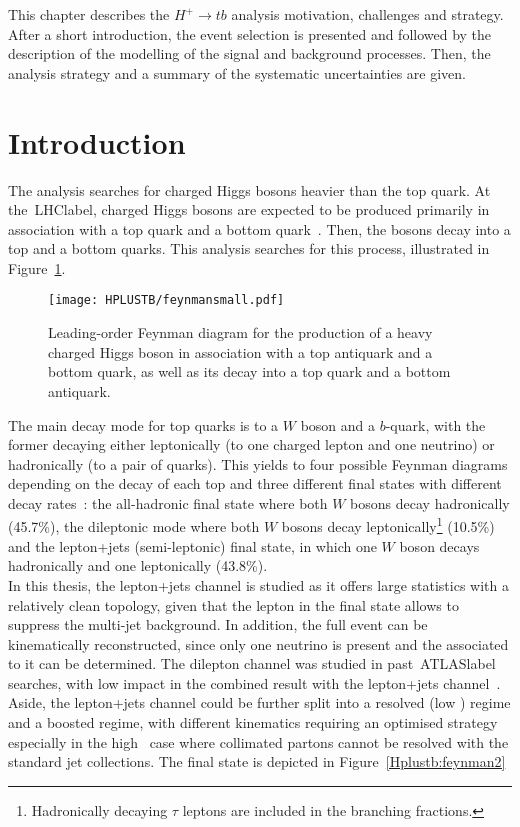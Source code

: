 This chapter describes the $H^+\to tb$ analysis motivation, challenges and strategy. After a short introduction, the event selection is presented and followed by the description of the modelling of the signal and background processes. Then, the analysis strategy and a summary of the systematic uncertainties are given.

\section{Introduction}
The analysis searches for charged Higgs bosons heavier than the top quark. At the~\acrshort{LHClabel}, charged Higgs bosons are expected to be produced primarily in association with a top quark and a bottom quark~\cite{CYRM-2017-002}. Then, the bosons decay into a top and a bottom quarks. This analysis searches for this process, illustrated in Figure~\ref{Hplustb:feynman1}.\\

\begin{figure}[htbp]
    \RawFloats
    \begin{center}
    \texttt{[image: HPLUSTB/feynmansmall.pdf]}
    \caption{
        Leading-order Feynman diagram for the production of a heavy charged Higgs boson in association with a top antiquark and a bottom quark, as well as its decay into a top quark and a bottom antiquark.
    }
    \label{Hplustb:feynman1}
    \end{center}
\end{figure}

The main decay mode for top quarks is to a $W$ boson and a $b$-quark, with the former decaying either leptonically (to one charged lepton and one neutrino) or hadronically (to a pair of quarks). This yields to four possible Feynman diagrams depending on the decay of each top and three different final states with different decay rates~\cite{pdg}: the all-hadronic final state where both $W$ bosons decay hadronically (45.7\%), the dileptonic mode where both $W$ bosons decay leptonically\footnote{Hadronically decaying $\tau$ leptons are included in the branching fractions.} (10.5\%) and the lepton+jets (semi-leptonic) final state, in which one $W$ boson decays hadronically and one leptonically (43.8\%).\\

In this thesis, the lepton+jets channel is studied as it offers large statistics with a relatively clean topology, given that the lepton in the final state allows to suppress the multi-jet background. In addition, the full event can be kinematically reconstructed, since only one neutrino is present and the \MET associated to it can be determined. The dilepton channel was studied in past~\acrshort{ATLASlabel} searches, with low impact in the combined result with the lepton+jets channel~\cite{ATLASHptb2018}. Aside, the lepton+jets channel could be further split into a resolved (low \pT) regime and a boosted regime, with different kinematics requiring an optimised strategy especially in the high \pT\ case where collimated partons cannot be resolved with the standard jet collections. The final state is depicted in Figure~\ref{Hplustb:feynman2}\\

